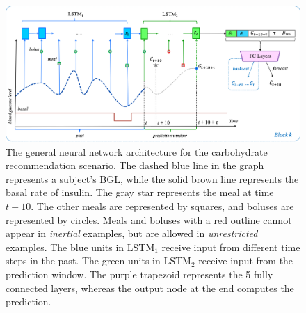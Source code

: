 
\begin{figure}[t]
    \includegraphics[width=\textwidth]{carbs-block}
    \caption{The general neural network architecture for the carbohydrate recommendation scenario. The dashed blue line in the graph represents a subject's \ac{BGL}, while the solid brown line represents the basal rate of insulin. The gray star represents the meal at time $t+10$. The other meals are represented by squares, and boluses are represented by circles. Meals and boluses with a red outline cannot appear in {\it inertial} examples, but are allowed in {\it unrestricted} examples. The blue units in $\text{LSTM}_{1}$ receive input from different time steps in the past. The green units in $\text{LSTM}_{2}$ receive input from the prediction window. The purple trapezoid represents the 5 fully connected layers, whereas the output node at the end computes the prediction.}
    \label{fig:carbs}
\end{figure}

